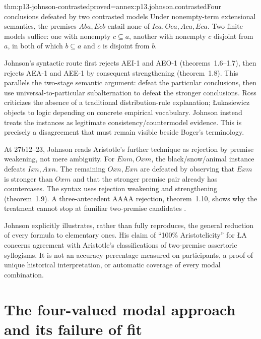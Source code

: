 \begin{hbtheorem}{thm:p13-johnson-contrasted}{proved=annex:p13.johnson.contrasted}{Four conclusions defeated by two contrasted models}
Under nonempty-term extensional semantics, the premises \(Aba,Ecb\)
entail none of \(Ica,Oca,Aca,Eca\). Two finite models suffice: one
with nonempty \(c\subseteq a\), another with nonempty \(c\) disjoint
from \(a\), in both of which \(b\subseteq a\) and \(c\) is disjoint
from \(b\).
\end{hbtheorem}

Johnson's syntactic route first rejects AEI-1 and AEO-1 (theorems~1.6--1.7),
then rejects AEA-1 and AEE-1 by consequent strengthening (theorem~1.8).
This parallels the two-stage semantic argument: defeat the particular
conclusions, then use universal-to-particular subalternation to defeat
the stronger conclusions. Ross criticizes the absence of a traditional
distribution-rule explanation; \L{}ukasiewicz objects to logic depending
on concrete empirical vocabulary. Johnson instead treats the instances
as legitimate consistency/countermodel evidence. This is precisely a
disagreement that must remain visible beside Boger's terminology.

At 27b12--23, Johnson reads Aristotle's further technique as rejection
by premise weakening, not mere ambiguity. For \(Enm,Oxm\), the
black/snow/animal instance defeats \(Ixn,Axn\). The remaining
\(Oxn,Exn\) are defeated by observing that \(Exm\) is stronger than
\(Oxm\) and that the stronger premise pair already has countercases.
The syntax uses rejection weakening and strengthening (theorem~1.9).
A three-antecedent AAAA rejection, theorem~1.10, shows why the treatment
cannot stop at familiar two-premise candidates
\parencite[pp.~257--258]{Johnson2004ModalSyllogisms}.

Johnson explicitly illustrates, rather than fully reproduces, the general
reduction of every formula to elementary ones. His claim of
\enquote{100\% Aristotelicity} for \L{}A concerns agreement with
Aristotle's classifications of two-premise assertoric syllogisms.
It is not an accuracy percentage measured on participants, a proof of
unique historical interpretation, or automatic coverage of every modal
combination.

\section{The four-valued modal approach and its failure of fit}
\label{sec:p13-johnson-lm}

